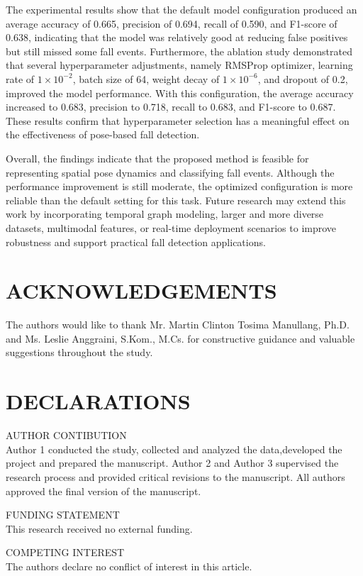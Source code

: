 \documentclass[10pt,TimesNewRoman,a4paper]{matrikenglish}
\begin{document}
The experimental results show that the default model configuration produced an average accuracy of 0.665, precision of 0.694, recall of 0.590, and F1-score of 0.638, indicating that the model was relatively good at reducing false positives but still missed some fall events. Furthermore, the ablation study demonstrated that several hyperparameter adjustments, namely RMSProp optimizer, learning rate of $1\times10^{-2}$, batch size of 64, weight decay of $1\times10^{-6}$, and dropout of 0.2, improved the model performance. With this configuration, the average accuracy increased to 0.683, precision to 0.718, recall to 0.683, and F1-score to 0.687. These results confirm that hyperparameter selection has a meaningful effect on the effectiveness of pose-based fall detection.

Overall, the findings indicate that the proposed method is feasible for representing spatial pose dynamics and classifying fall events. Although the performance improvement is still moderate, the optimized configuration is more reliable than the default setting for this task. Future research may extend this work by incorporating temporal graph modeling, larger and more diverse datasets, multimodal features, or real-time deployment scenarios to improve robustness and support practical fall detection applications.

\section{ACKNOWLEDGEMENTS}
\label{}
The authors would like to thank Mr. Martin Clinton Tosima Manullang, Ph.D. and Ms. Leslie Anggraini, S.Kom., M.Cs. for constructive guidance and valuable suggestions throughout the study.

\section{DECLARATIONS}
\label{}
AUTHOR CONTIBUTION\\
Author 1 conducted the study, collected and analyzed the data,developed the project and prepared the manuscript. Author 2 and Author 3 supervised the research process and provided critical revisions to the manuscript. All authors approved the final version of the manuscript.

FUNDING STATEMENT\\
This research received no external funding.

COMPETING INTEREST \\
The authors declare no conflict of interest in this article.




\end{document}
